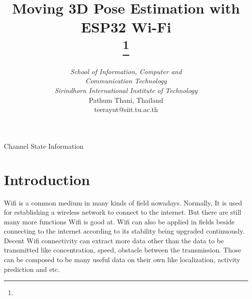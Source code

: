 \documentclass[conference]{IEEEtran}
\begin{document}
	
	\title{Moving 3D Pose Estimation with ESP32 Wi-Fi \\
		{\footnotesize \textsuperscript{}}
		\thanks{}
	}
	
	\author{
		\and
		\IEEEauthorblockA
		{\textit{School of Information, Computer and}\\ \textit{Communication Technology} \\
			\textit{Sirindhorn International Institute of Technology}\\
			Pathum Thani, Thailand \\
			teerayut@siit.tu.ac.th}
	}
	
	
	
	
	
	
	\maketitle
	
	
	
	
	\begin{abstract}

		
	\end{abstract}
	
	\begin{IEEEkeywords}
		Channel State Information
	\end{IEEEkeywords}
	
	\section{Introduction}
		 Wifi is a common medium in many kinds of field nowadays. Normally, It is used for establishing a wireless network to connect to the internet. But there are still many more functions Wifi is good at. Wifi can also be applied in fields beside connecting to the internet according to its stability being upgraded continuously. Decent Wifi connectivity can extract more data other than the data to be transmitted like concentration, speed, obstacle between the transmission. Those can be composed to be many useful data on their own like localization, activity prediction and  etc.
		 
\end{document}
